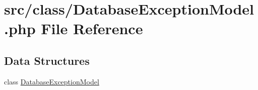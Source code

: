 \hypertarget{_database_exception_model_8php}{}\section{src/class/\+Database\+Exception\+Model.php File Reference}
\label{_database_exception_model_8php}
\subsection*{Data Structures}
\begin{DoxyCompactItemize}
\item 
class \hyperlink{class_database_exception_model}{Database\+Exception\+Model}
\end{DoxyCompactItemize}
